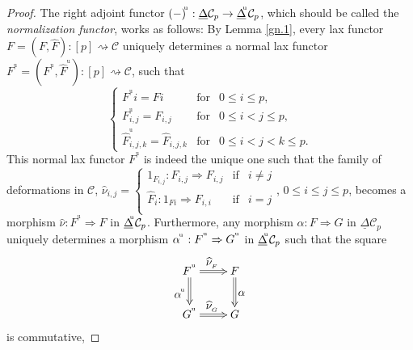 \documentclass[]{amsart}
\begin{document}
\begin{proof}
The right adjoint functor  $(-)\hspace{-2pt}^{^\mathrm{u}}:{\ensuremath{\underline{\Delta}}}{\ensuremath{\mathcal{C}}}_p\to
{\ensuremath{\underline{\Delta}}}\hspace{-3pt}^{^\mathrm{u}}{\ensuremath{\mathcal{C}}}_p$,  which should be called the {\em normalization functor},
works as follows: By Lemma \ref{gn.1}, every lax functor $F=(F,\widehat{F}):[p]\rightsquigarrow{\ensuremath{\mathcal{C}}}$
uniquely determines a normal lax functor
$F^{^\mathrm{u}}=(F^{^\mathrm{u}},\widehat{F}^{^\mathrm{u}}):[p]\rightsquigarrow {\ensuremath{\mathcal{C}}}$, such that
$$
\left\{\begin{array}{lll}F^{^\mathrm{u}}\!i=Fi& \text{for}& 0\leq i\leq p,\\[4pt]
F^{^\mathrm{u}}_{i,j}=F_{i,j}& \text{for}&0\leq i<j\leq p,\\[4pt]
\widehat{F}^{^\mathrm{u}}_{i,j,k}=\widehat{F}_{i,j,k}&\text{for}&0\leq i<j<k\leq
p.\end{array}\right.
$$
This normal lax functor $F^{^\mathrm{u}}$ is indeed the unique one such that the family of deformations in ${\ensuremath{\mathcal{C}}}$, $\widehat{\nu}_{i,j}=\left\{\begin{array}{lcl}
  1_{F_{i,j}}:F_{i,j}\Rightarrow F_{i,j} & \text{if} & i\neq j   \\
  \widehat{F}_i:1_{Fi}\Rightarrow F_{i,i} & \text{if} & i=j  \\
\end{array} \right.$, $0\leq i \leq j\leq p$, becomes a morphism $\widehat{\nu}:F^{^\mathrm{u}}\Rightarrow F$ in ${\ensuremath{\underline{\Delta}}}\hspace{-3pt}^{^\mathrm{u}}{\ensuremath{\mathcal{C}}}_p$.
Furthermore, any morphism $\alpha:F\Rightarrow G$ in ${\ensuremath{\underline{\Delta}}}{\ensuremath{\mathcal{C}}}_p$ uniquely determines a morphism
$\alpha\hspace{-1pt}^{^{_\mathrm{u}}}:F^{^\mathrm{u}}\Rightarrow G^{^\mathrm{u}}$ in
${\ensuremath{\underline{\Delta}}}\hspace{-3pt}^{^\mathrm{u}}{\ensuremath{\mathcal{C}}}_p$ such that the square
$$\xymatrix@C=9pt@R=9pt{F^{^\mathrm{u}}\ar@2[rr]^{\textstyle\widehat{\nu}_{_F}} \ar@2[dd]_{\textstyle\alpha\hspace{-1pt}^{^{_\mathrm{u}}}} && F \ar@2[dd]^{\textstyle{\alpha}} \\
&&\\
G^{^\mathrm{u}}\ar@2[rr]^{\textstyle\widehat{\nu}_{_G}} && G\\ }$$ is commutative,

\end{proof}
\end{document}
